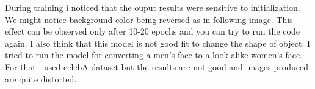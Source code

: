 \documentclass[peerreview]{IEEEtran}
\begin{document}
During training i noticed that the ouput results were sensitive to initialization. We might notice background color being reversed as in following image. This effect can be observed only after 10-20 epochs and you can try to run the code again. I also think that this model is not good fit to change the shape of object. I tried to run the model for converting a men's face to a look alike women's face. For that i used celebA dataset but the results are not good and images produced are quite distorted.

\end{document}
